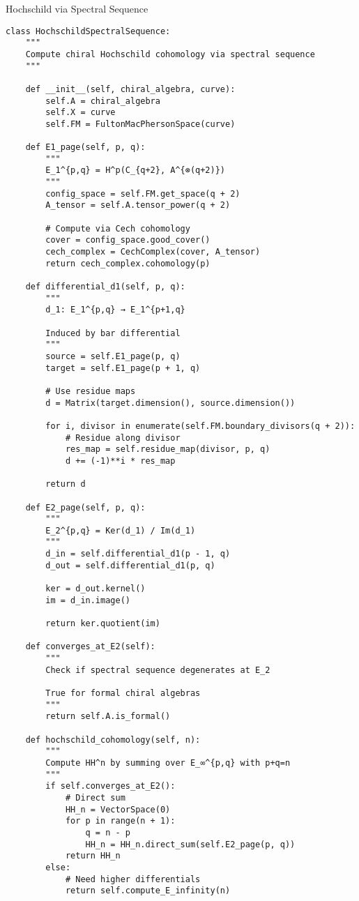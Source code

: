 \begin{algorithm}
\caption{Hochschild via Spectral Sequence}
\begin{verbatim}
class HochschildSpectralSequence:
    """
    Compute chiral Hochschild cohomology via spectral sequence
    """
    
    def __init__(self, chiral_algebra, curve):
        self.A = chiral_algebra
        self.X = curve
        self.FM = FultonMacPhersonSpace(curve)
        
    def E1_page(self, p, q):
        """
        E_1^{p,q} = H^p(C_{q+2}, A^{⊗(q+2)})
        """
        config_space = self.FM.get_space(q + 2)
        A_tensor = self.A.tensor_power(q + 2)
        
        # Compute via Cech cohomology
        cover = config_space.good_cover()
        cech_complex = CechComplex(cover, A_tensor)
        return cech_complex.cohomology(p)
    
    def differential_d1(self, p, q):
        """
        d_1: E_1^{p,q} → E_1^{p+1,q}
        
        Induced by bar differential
        """
        source = self.E1_page(p, q)
        target = self.E1_page(p + 1, q)
        
        # Use residue maps
        d = Matrix(target.dimension(), source.dimension())
        
        for i, divisor in enumerate(self.FM.boundary_divisors(q + 2)):
            # Residue along divisor
            res_map = self.residue_map(divisor, p, q)
            d += (-1)**i * res_map
            
        return d
    
    def E2_page(self, p, q):
        """
        E_2^{p,q} = Ker(d_1) / Im(d_1)
        """
        d_in = self.differential_d1(p - 1, q)
        d_out = self.differential_d1(p, q)
        
        ker = d_out.kernel()
        im = d_in.image()
        
        return ker.quotient(im)
    
    def converges_at_E2(self):
        """
        Check if spectral sequence degenerates at E_2
        
        True for formal chiral algebras
        """
        return self.A.is_formal()
    
    def hochschild_cohomology(self, n):
        """
        Compute HH^n by summing over E_∞^{p,q} with p+q=n
        """
        if self.converges_at_E2():
            # Direct sum
            HH_n = VectorSpace(0)
            for p in range(n + 1):
                q = n - p
                HH_n = HH_n.direct_sum(self.E2_page(p, q))
            return HH_n
        else:
            # Need higher differentials
            return self.compute_E_infinity(n)
\end{verbatim}
\end{algorithm}

